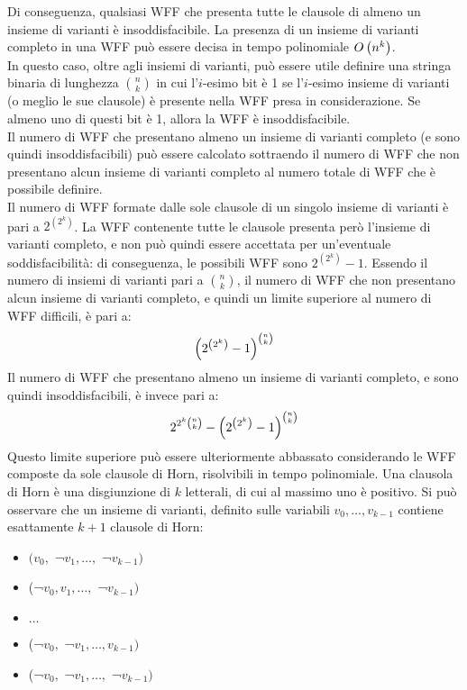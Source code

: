 Di conseguenza, qualsiasi WFF che presenta tutte le clausole di almeno un insieme di 
varianti è insoddisfacibile. La presenza di un insieme di varianti completo in una WFF può
essere decisa in tempo polinomiale $O\left(n^k\right)$.\\
In questo caso, oltre agli insiemi di varianti, può essere utile definire una stringa 
binaria di lunghezza $\binom{n}{k}$ in cui l'$i$-esimo bit è 1
se l'$i$-esimo insieme di varianti (o meglio le sue clausole) è presente nella WFF presa 
in considerazione.
Se almeno uno di questi bit è 1, allora la WFF è insoddisfacibile.\\
Il numero di WFF che presentano almeno un insieme di varianti completo (e sono quindi 
insoddisfacibili) può essere calcolato sottraendo il numero di WFF che non 
presentano alcun insieme di varianti completo al numero totale 
di WFF che è possibile definire.\\
Il numero di WFF formate dalle sole clausole di un singolo insieme di varianti è pari a $2^{(2^k)}$. La WFF contenente tutte le clausole presenta però l'insieme di varianti completo, e non può quindi essere accettata per un'eventuale soddisfacibilità: di conseguenza, le possibili WFF sono $2^{(2^k)} - 1$.
Essendo il numero di insiemi di varianti pari a $\binom{n}{k}$, il numero di WFF che non presentano alcun insieme di varianti completo, e quindi un limite 
superiore al numero di WFF difficili, è pari a:
\begin{equation*}
    \left(2^{\left(2^k\right)} - 1\right)^{\binom{n}{k}}
\end{equation*}
Il numero di WFF che presentano almeno un insieme di varianti completo, e sono quindi 
insoddisfacibili, è invece pari a:
\begin{equation*}
    2^{2^k \binom{n}{k}} - \left(2^{\left(2^k\right)} - 1\right)^{\binom{n}{k}}
\end{equation*}
Questo limite superiore può essere ulteriormente abbassato considerando le WFF composte da sole clausole di Horn, risolvibili in tempo polinomiale.
Una clausola di Horn è una disgiunzione di $k$ letterali, di cui al massimo uno è positivo.
Si può osservare che un insieme di varianti, definito sulle variabili $v_0, \ldots, v_{k-1}$ contiene esattamente $k+1$ clausole di Horn:
\begin{itemize}
    \item $(v_0,$ ¬$v_1, \ldots,$ ¬$v_{k-1})$
    \item (¬$v_0, v_1, \ldots,$ ¬$v_{k-1})$
    \item $\ldots$
    \item (¬$v_0,$ ¬$v_1, \ldots, v_{k-1})$
    \item (¬$v_0,$ ¬$v_1, \ldots,$ ¬$v_{k-1})$
\end{itemize}
